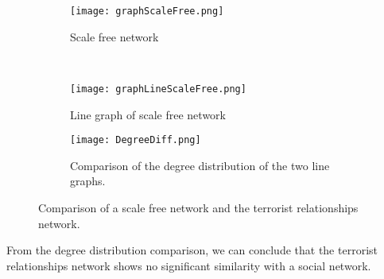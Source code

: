 \begin{figure}[H]
\begin{center}
    \begin{subfigure}[b]{0.4\textwidth}
        \texttt{[image: graphScaleFree.png]}
        \caption{Scale free network}
        \label{fig:Scalefree}
    \end{subfigure}
    ~
    \begin{subfigure}[b]{0.4\textwidth}
        \texttt{[image: graphLineScaleFree.png]}
        \caption{Line graph of scale free network}
        \label{fig:lineG}
    \end{subfigure}
    
    \begin{subfigure}[b]{\textwidth}
    	\begin{centering}
        \texttt{[image: DegreeDiff.png]}
        \caption{\centering Comparison of the degree distribution of the two line graphs.}
        \label{fig:DegDiff}
        \end{centering}
    \end{subfigure}
\caption{Comparison of a scale free network and the terrorist relationships network.}
\label{fig:RelationshipScaleFree}
\end{center}
\end{figure}

From the degree distribution comparison, we can conclude that the terrorist relationships network shows no significant similarity with a  social network. 
%
